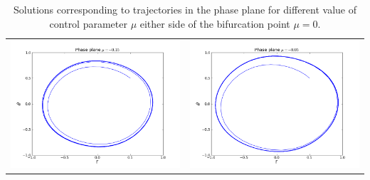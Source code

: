 \begin{table}[ht]
\begin{tabular}{cc}
\includegraphics[scale=0.3]{phase_snic015m}&\includegraphics[scale=0.3]{phase_snic005m}\\
\end{tabular}
\caption{Solutions corresponding to trajectories in the phase plane for different value of
control parameter $\mu$ either side of the bifurcation point $\mu = 0$.}
\label{fig:phase_plane_hopf}
\end{table}
